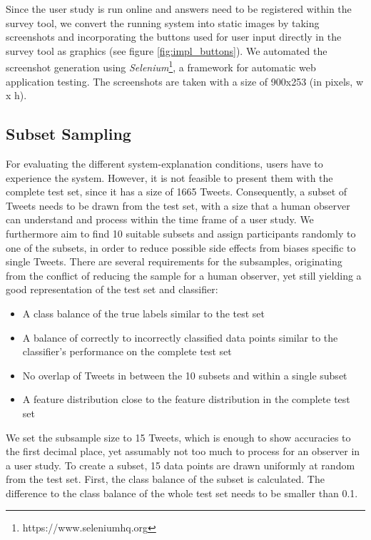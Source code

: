 \noindent Since the user study is run online and answers need to be registered within the survey tool, we convert the running system into static images by taking screenshots and incorporating the buttons used for user input directly in the survey tool as graphics (see figure \ref{fig:impl_buttons}). We automated the screenshot generation using \textit{Selenium}\footnote{https://www.seleniumhq.org}, a framework for automatic web application testing. The screenshots are taken with a size of 900x253 (in pixels, w x h).



\subsection{Subset Sampling}
\label{subsec:subset_sampling}
For evaluating the different system-explanation conditions, users have to experience the system. However, it is not feasible to present them with the complete test set, since it has a size of 1665 Tweets. Consequently, a subset of Tweets needs to be drawn from the test set, with a size that a human observer can understand and process within the time frame of a user study.\newline
We furthermore aim to find 10 suitable subsets and assign participants randomly to one of the subsets, in order to reduce possible side effects from biases specific to single Tweets.\newline
There are several requirements for the subsamples, originating from the conflict of reducing the sample for a human observer, yet still yielding a good representation of the test set and classifier:\newline
\begin{itemize}
	\item A class balance of the true labels similar to the test set
	\item A balance of correctly to incorrectly classified data points similar to the classifier's performance on the complete test set
	\item No overlap of Tweets in between the 10 subsets and within a single subset
	\item A feature distribution close to the feature distribution in the complete test set
\end{itemize}
We set the subsample size to 15 Tweets, which is enough to show accuracies to the first decimal place, yet assumably not too much to process for an observer in a user study.\newline
To create a subset, 15 data points are drawn uniformly at random from the test set. First, the class balance of the subset is calculated. The difference to the class balance of the whole test set needs to be smaller than 0.1.\newline
